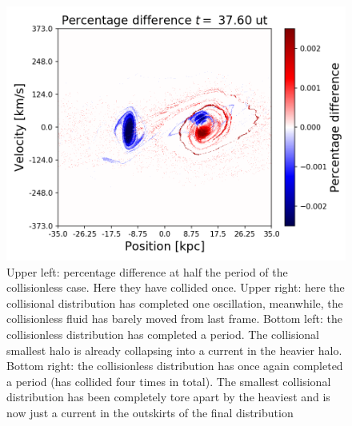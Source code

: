 \begin{figure}[h!]
    \includegraphics[scale=0.45]{imag/diffBullet94.png}
    \caption{Upper left: percentage difference at half the period of the collisionless case. Here they have collided once. Upper right: here the collisional distribution has completed one oscillation, meanwhile, the collisionless fluid has barely moved from last frame. Bottom left: the collisionless distribution has completed a period. The collisional smallest halo is already collapsing into a current in the heavier halo. Bottom right: the collisionless distribution has once again completed a period (has collided four times in total). The smallest collisional distribution has been completely tore apart by the heaviest and is now just a current in the outskirts of the final distribution }
        \label{colBulletPhase}
\end{figure}



\newpage
